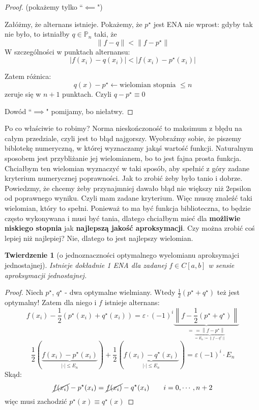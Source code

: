 \documentclass[hidelinks,a4paper,fleqn,oneside]{book}
\newcommand{\norm}[1]{\left\lVert#1\right\rVert}
\newtheorem{twierdz}{Twierdzenie}
\begin{document}
\begin{proof}(pokażemy tylko ``$\impliedby$")

Załóżmy, że alternans istnieje. Pokażemy, że $p^\star$ jest ENA nie wprost: gdyby tak nie było, to istniałby $q \in \mathbb{P}_n$ taki, że
\[
	\norm{f-q} < \norm{f - p^\star}
\]
W szczególności w punktach alternansu:
\[
	|f(x_i) - q(x_i)| < |f(x_i) - p^\star(x_i)|
\]
\begin{tikzpicture}
\end{tikzpicture}

Zatem różnica:
\[
	q(x) - p^\star \leftarrow \textrm{wielomian stopnia }\leq n
\]
zeruje się w $n+1$ punktach. Czyli $q-p^\star \equiv 0$

Dowód ``$\implies$" pomijamy, bo niełatwy.
\end{proof}
Po co właściwie to robimy? Norma nieskończoność to maksimum z błędu na całym przedziale, czyli jest to błąd najgorszy. Wyobraźmy sobie, że piszemy biblotekę numeryczną, w której wyznaczamy jakąś wartość funkcji. Naturalnym sposobem jest przybliżanie jej wielomianem, bo to jest fajna prosta funkcja. Chciałbym ten wielomian wyznaczyć w taki sposób, aby spełnić z góry zadane kryterium numerycznej poprawności. Jak to zrobić żeby było tanio i dobrze. Powiedzmy, że chcemy żeby przynajmniej dawało błąd nie większy niż 2epsilon od poprawnego wyniku. Czyli mam zadane kryterium. Więc muszę znaleźć taki wielomian, który to spełni. Ponieważ to ma być funkcja biblioteczna, to będzie często wykonywana i musi być tania, dlatego chciałbym mieć dla \textbf{możliwie niskiego stopnia} jak \textbf{najlepszą jakość aproksymacji}. Czy można zrobić coś lepiej niż najlepiej? Nie, dlatego to jest najlepszy wielomian.

\begin{twierdz}[o jednoznaczności optymalnego wyelomianu aproksymajci jednostajnej]
Istnieje dokładnie 1 ENA dla zadanej $f \in C[a, b]$ w sensie aproksymacji jednostajnej.
\end{twierdz}
\begin{proof}
Niech $p^\star$, $q^\star$ - dwa optymalne wielmiany. Wtedy $\frac{1}{2}(p^\star + q^\star)$ też jest optymalny! Zatem dla niego i $f$ istnieje alternans:
\[
	f(x_i) - \frac{1}{2}(p^\star(x_i) + q^\star(x_i)) = \varepsilon\cdot(-1)^i\underbrace{\norm{f-\frac{1}{2}(p^\star + q^\star)}}_{=\underbrace{=\norm{f-p^\star}}_{=E_n := \norm{f - q^\star}}}
\]
\[
	\frac{1}{2}(\underbrace{f(x_i) - p^\star(x_i)}_{|\cdot| \leq E_n}) + \frac{1}{2}(\underbrace{f(x_i) - q^\star(x_i)}_{|\cdot| \leq E_n}) = \varepsilon(-1)^i\cdot E_n
\]
Skąd:
\[
	\cancel{f(x_i)} - p^\star(x_i) = \cancel{f(x_i)} - q^\star(x_i) \quad \quad i = 0, \cdots, n+2
\]
więc musi zachodzić $p^\star(x) \equiv q^\star(x)$
\end{proof}
\end{document}
